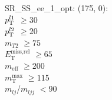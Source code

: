 SR\_SS\_ee\_1\_opt: (175, 0): \\
$p_{\text{T}}^{l1}$ $\geq 30$ \\
$p_{\text{T}}^{l2}$ $\geq 20$ \\
$m_{T2}$ $\geq 75$ \\
$E_{\text{T}}^{\text{miss,rel}}$ $\geq 65$ \\
$m_{\text{eff}}$ $\geq 200$ \\
$m_{\text{T}}^{\text{max}}$ $\geq 115$ \\
$m_{lj}$/$m_{ljj}$ $<90$ \\

